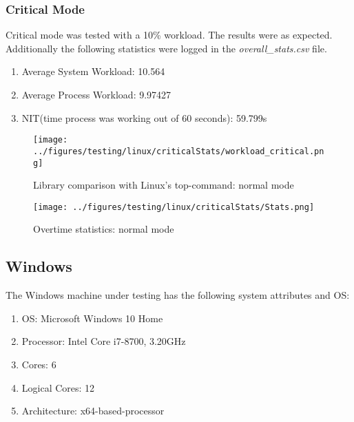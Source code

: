 \subsubsection{Critical Mode}
Critical mode was tested with a 10\% workload. The results were as expected. Additionally the following statistics were logged in the \textit{overall\_stats.csv} file.
\begin{enumerate}
	\item Average System Workload: 10.564
	\item Average Process Workload: 9.97427
	\item NIT(time process was working out of 60 seconds): 59.799s
\end{enumerate}
\begin{figure}[!htbp]
	\centering
	\begin{minipage}[b]{\textwidth}
		\centering
		\texttt{[image: ../figures/testing/linux/criticalStats/workload\_critical.png]}
		\caption{Library comparison with Linux's top-command: normal mode}
		\hspace{3mm}
	\end{minipage}
	\begin{minipage}[b]{\textwidth}
		\centering
		\texttt{[image: ../figures/testing/linux/criticalStats/Stats.png]}
		\caption{Overtime statistics: normal mode}
	\end{minipage}
\end{figure}
\newpage
\subsection{Windows}
The Windows machine under testing has the following system attributes and OS:
\begin{enumerate}
	\item OS: Microsoft Windows 10 Home
	\item Processor: Intel Core i7-8700, 3.20GHz
	\item Cores: 6
	\item Logical Cores: 12
	\item Architecture: x64-based-processor
\end{enumerate}
